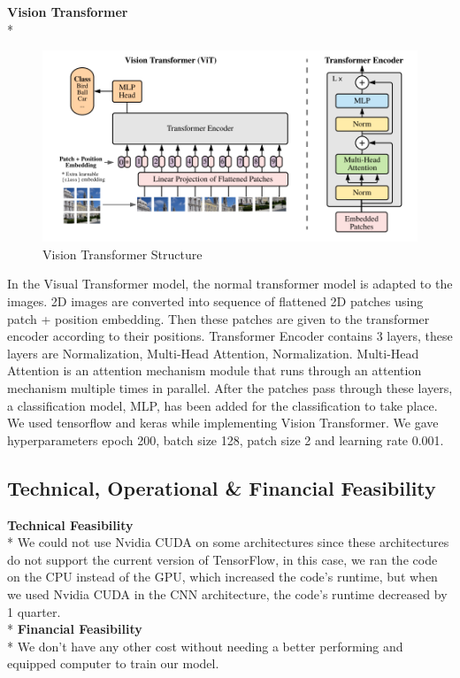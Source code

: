 \documentclass{article}
\begin{document}
\textbf{\large Vision Transformer} \\*
\begin{figure}[H]
\begin{center}
    \includegraphics[scale=0.4]{Assets/vit_structure.png}
    \caption{Vision Transformer Structure}
\end{center}
\end{figure}
\noindent
In the Visual Transformer model, the normal transformer model is adapted to the images. 2D images are converted into sequence of flattened 2D patches using patch + position embedding. Then these patches are given to the transformer encoder according to their positions. Transformer Encoder contains 3 layers, these layers are Normalization, Multi-Head Attention, Normalization. Multi-Head Attention is an attention mechanism module that runs through an attention mechanism multiple times in parallel. After the patches pass through these layers, a classification model, MLP, has been added for the classification to take place. We used tensorflow and keras while implementing Vision Transformer. We gave hyperparameters epoch 200, batch size 128, patch size 2 and learning rate 0.001.
\subsection{Technical, Operational \& Financial Feasibility}
\textbf{Technical Feasibility} \vspace{0.1}\\*
We could not use Nvidia CUDA on some architectures since these architectures do not support the current version of TensorFlow, in this case, we ran the code on the CPU instead of the GPU, which increased the code's runtime, but when we used Nvidia CUDA in the CNN architecture, the code's runtime decreased by 1 quarter.\vspace{0.2cm}\\*
\textbf{Financial Feasibility} \vspace{0.1}\\*
We don't have any other cost without needing a better performing and equipped computer to train our model.
\end{document}
